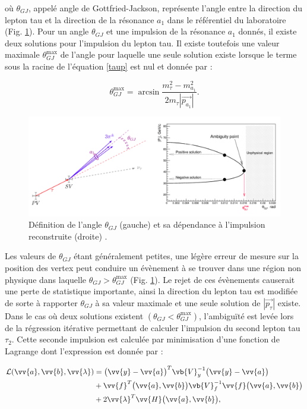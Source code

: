 où $\theta_{GJ}$, appelé angle de Gottfried-Jackson, représente l'angle entre la direction du lepton tau et la direction de la résonance $a_1$ dans le référentiel du laboratoire (Fig. \ref{thetaGF}). Pour un angle $\theta_{GJ}$ et une impulsion de la résonance $a_1$ donnés, il existe deux solutions pour l'impulsion du lepton tau. Il existe toutefois une valeur maximale $\theta_{GJ}^{\text{max}}$ de l'angle pour laquelle une seule solution existe lorsque le terme sous la racine de l'équation \ref{taup} est nul et donnée par :

\begin{equation}
    \theta_{GJ}^{\text{max}}=\arcsin\frac{m_{\tau}^2-m_{a_1}^2}{2m_{\tau}|\vec{p_{a_1}}|}.
\end{equation}

\begin{figure}
    \centering
    \includegraphics[scale=0.35]{Chapitre6/Images/thetaGF.png}
    \caption{Définition de l'angle $\theta_{GJ}$ (gauche) et sa dépendance à l'impulsion reconstruite (droite) \cite{GEF}.}
    \label{thetaGF}
\end{figure}

Les valeurs de $\theta_{GJ}$ étant généralement petites, une légère erreur de mesure sur la position des vertex peut conduire un évènement à se trouver dans une région non physique dans laquelle $\theta_{GJ}>\theta_{GJ}^{\text{max}}$ (Fig. \ref{thetaGF}). Le rejet de ces évènements causerait une perte de statistique importante, ainsi la direction du lepton tau est modifiée de sorte à rapporter $\theta_{GJ}$ à sa valeur maximale et une seule solution de $|\vec{p_{\tau}}|$ existe. Dans le cas où deux solutions existent $(\theta_{GJ}<\theta_{GJ}^{\text{max}})$, l'ambiguïté est levée lors de la régression itérative permettant de calculer l'impulsion du second lepton tau $\tau_2$. Cette seconde impulsion est calculée par minimisation d'une fonction de Lagrange dont l'expression est donnée par :

\begin{align}
\begin{split}
    \mathcal{L}(\vv{a},\vv{b},\vv{\lambda})&=\bigl(\vv{y}-\vv{a}\bigr)^{T}\vb{V}^{-1}_{y}\bigl(\vv{y}-\vv{a}\bigr) \\
    & +\vv{f}^{T}\bigl(\vv{a},\vv{b}\bigr)\vb{V}^{-1}_{f}\vv{f}\bigl(\vv{a},\vv{b}\bigr)\\
    & +2\vv{\lambda}^{T}\vv{H}\bigl(\vv{a},\vv{b}\bigr),
\end{split}
\end{align}

